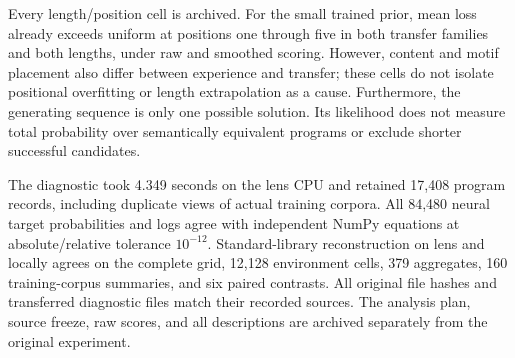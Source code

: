 \documentclass[11pt]{article}
\begin{document}
Every length/position cell is archived. For the small trained prior, mean
loss already exceeds uniform at positions one through five in both transfer
families and both lengths, under raw and smoothed scoring. However, content
and motif placement also differ between experience and transfer; these cells
do not isolate positional overfitting or length extrapolation as a cause.
Furthermore, the generating sequence is only one possible solution. Its
likelihood does not measure total probability over semantically equivalent
programs or exclude shorter successful candidates.

The diagnostic took 4.349 seconds on the lens CPU and retained 17,408 program
records, including duplicate views of actual training corpora. All 84,480
neural target probabilities and logs agree with independent NumPy equations
at absolute/relative tolerance $10^{-12}$. Standard-library reconstruction
on lens and locally agrees on the complete grid, 12,128 environment cells,
379 aggregates, 160 training-corpus summaries, and six paired contrasts.
All original file hashes and transferred diagnostic files match their
recorded sources. The analysis plan, source freeze, raw scores, and all
descriptions are archived separately from the original experiment.
\end{document}
